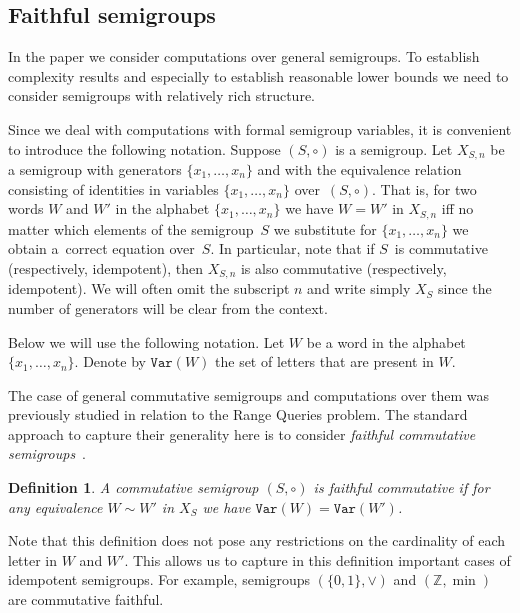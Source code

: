 \documentclass[11pt,letterpaper]{article}
\newtheorem{definition}{Definition}
\newcommand{\var}{\texttt{Var}}
\begin{document}
\lowerthm*



\subsection{Faithful semigroups}

In the paper we consider computations over general semigroups. To establish
complexity results and especially to establish reasonable lower bounds we need
to consider semigroups with relatively rich structure.

Since we deal with computations with formal semigroup variables, it is
convenient to introduce the following notation. Suppose $(S, \circ)$ is a
semigroup. Let $X_{S,n}$ be a semigroup with generators $\{x_1,\ldots, x_n\}$
and with the equivalence relation consisting of identities in variables
$\{x_1,\ldots, x_n\}$ over~$(S,\circ)$. That is, for two words $W$ and $W'$ in
the alphabet $\{x_1,\ldots,x_n\}$ we have $W=W'$ in $X_{S,n}$ iff no matter which
elements of the semigroup~$S$ we substitute for $\{x_1,\ldots, x_n\}$ we obtain
a~correct equation over~$S$. In particular, note that if $S$~is commutative
(respectively, idempotent), then $X_{S,n}$ is also commutative (respectively,
idempotent). We will often omit the subscript $n$ and write simply $X_S$ since the number of generators will be clear from the context.

Below we will use the following notation. Let $W$ be a word in the alphabet
$\{x_1,\ldots, x_n\}$. Denote by $\var(W)$ the set of letters that are present
in $W$.

The case of general commutative semigroups and computations over them was
previously studied in relation to the Range Queries problem. The standard
approach to capture their generality here is to consider \emph{faithful
commutative semigroups}~\cite{DBLP:conf/stoc/Yao82,DBLP:journals/ijcga/ChazelleR91}.

\begin{definition}
A commutative semigroup $(S, \circ)$ is \emph{faithful commutative} if for any
equivalence $W\sim W'$ in $X_S$ we have $\var(W)=\var(W')$.
\end{definition}

Note that this definition does not pose any restrictions on the cardinality of
each letter in $W$ and $W'$. This allows us to capture in this definition
important cases of idempotent semigroups. For example, semigroups
$(\{0,1\}, \vee)$ and $(\mathbb{Z},\min)$ are commutative faithful.
\end{document}
